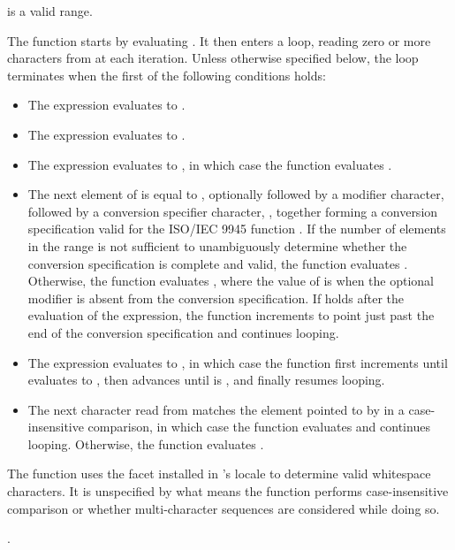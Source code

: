 \begin{itemdescr}
\pnum
\expects
{} is a valid range.

\pnum
\effects
The function starts by evaluating .
It then enters a loop,
reading zero or more characters from  at each iteration.
Unless otherwise specified below,
the loop terminates when the first of the following conditions holds:

\begin{itemize}
\item
The expression  evaluates to .
\item
The expression  evaluates to .
\item
The expression  evaluates to ,
in which case
the function evaluates .
\item
The next element of  is equal to ,
optionally followed by a modifier character,
followed by a conversion specifier character, ,
together forming a conversion specification
valid for the ISO/IEC 9945 function .
If the number of elements in the range 
is not sufficient to unambiguously determine
whether the conversion specification is complete and valid,
the function evaluates .
Otherwise,
the function evaluates ,
where the value of  is 
when the optional modifier is absent from the conversion specification.
If  holds
after the evaluation of the expression,
the function increments 
to point just past the end of the conversion specification and
continues looping.

\item
The expression  evaluates to ,
in which case the function first increments  until
 evaluates to ,
then advances 
until  is , and
finally resumes looping.

\item
The next character read from 
matches the element pointed to by  in a case-insensitive comparison,
in which case the function evaluates  and continues looping.
Otherwise, the function evaluates .
\end{itemize}

\pnum
\begin{note}
The function uses the  facet
installed in 's locale
to determine valid whitespace characters.
It is unspecified
by what means the function performs case-insensitive comparison or
whether multi-character sequences are considered while doing so.
\end{note}

\pnum
\returns
{}.
\end{itemdescr}

